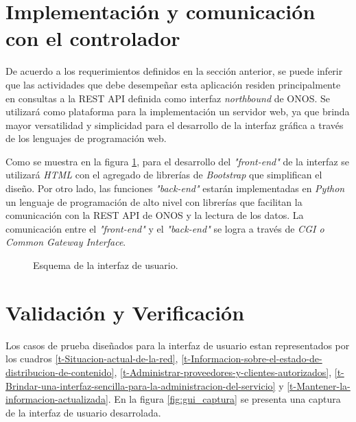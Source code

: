 \section{Implementación y comunicación con el controlador}

De acuerdo a los requerimientos definidos en la sección anterior, se puede inferir que las actividades que debe desempeñar esta aplicación residen principalmente en consultas a la REST API definida como interfaz \textit{northbound} de ONOS. Se utilizará como plataforma para la implementación un servidor web, ya que brinda mayor versatilidad y simplicidad para el desarrollo de la interfaz gráfica a través de los lenguajes de programación web. 

Como se muestra en la figura \ref{fig:gui_diagram}, para el desarrollo del \textit{"front-end"}  de la interfaz se utilizará \textit{HTML} con el agregado de librerías de \textit{Bootstrap} que simplifican el diseño. Por otro lado, las funciones \textit{"back-end"} estarán implementadas en \textit{Python} un lenguaje de programación de alto nivel con librerías que facilitan la comunicación con la REST API de ONOS y la lectura de los datos. La comunicación entre el \textit{"front-end"} y  el \textit{"back-end"} se logra a través de \textit{CGI o Common Gateway Interface}.

\begin{figure}[th]
	\centering 
	\caption[Esquema de la interfaz de usuario]{Esquema de la interfaz de usuario.}
	\label{fig:gui_diagram}
\end{figure}



\section{Validación y Verificación}

Los casos de prueba diseñados para la interfaz de usuario estan representados por los cuadros \ref{t-Situacion-actual-de-la-red}, \ref{t-Informacion-sobre-el-estado-de-distribucion-de-contenido}, \ref{t-Administrar-proveedores-y-clientes-autorizados}, \ref{t-Brindar-una-interfaz-sencilla-para-la-administracion-del-servicio} y \ref{t-Mantener-la-informacion-actualizada}. En la figura \ref{fig:gui_captura} se presenta una captura de la interfaz de usuario desarrolada.

